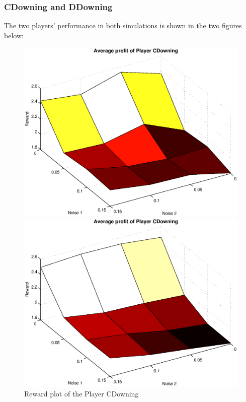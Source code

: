 \subsubsection{CDowning and DDowning}
The two players' performance in both simulations is shown in the two figures below:
\begin{figure}[h]
\begin{minipage}[hbt]{0.65\textwidth}
	\centering
	\includegraphics[width=\textwidth]{pics/simulation1/Reward_vs_Noise_of_Player_CDowning}
\end{minipage}
\hfill
\begin{minipage}[hbt]{0.3\textwidth}
	\centering
	\includegraphics[width=\textwidth]{pics/simulation2/Reward_vs_Noise_of_Player_CDowning}
\end{minipage}
	\caption{Reward plot of the Player CDowning}
	\label{pic player cd}
\end{figure}

